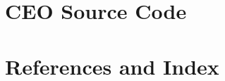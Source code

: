 \documentclass[oldfontcommands]{memoir}
\begin{document}


\part{CEO Source Code}



\part*{References and Index}



%

\printindex
\end{document}
